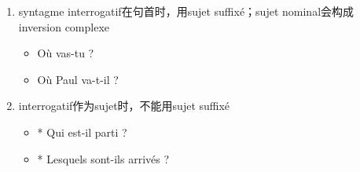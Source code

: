\documentclass[UTF8]{report}
\begin{document}
\begin{enumerate}
    \item syntagme interrogatif在句首时，用sujet suffixé；sujet nominal会构成 inversion complexe
    \begin{itemize}
        \item Où vas-tu ?
        \item Où Paul va-t-il ?
    \end{itemize}
    \item interrogatif作为sujet时，不能用sujet suffixé
    \begin{itemize}
        \item * Qui est-il parti ?
        \item * Lesquels sont-ils arrivés ?
    \end{itemize}
\end{enumerate}
\end{document}
